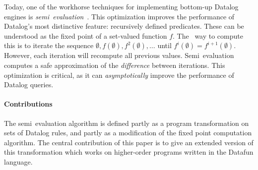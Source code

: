 Today, one of the workhorse techniques for implementing bottom-up Datalog
engines is \emph{semi\naive\ evaluation}~\cite{seminaive}. This optimization
improves the performance of Datalog's most distinctive feature: recursively
defined predicates. These can be understood as the fixed point of a set-valued
function $f$. The \naive\ way to compute this is to iterate the sequence
$\emptyset, f(\emptyset), f^2(\emptyset), \dots$ until $f^i(\emptyset) =
f^{i+1}(\emptyset)$. However, each iteration will recompute all previous values.
Semi\naive\ evaluation computes a safe approximation of the \emph{difference}
between iterations. This optimization is critical, as it can
\emph{asymptotically} improve the performance of Datalog queries.


\paragraph{Contributions} The semi\naive\ evaluation algorithm is
defined partly as a program transformation on sets of Datalog rules,
and partly as a modification of the fixed point computation algorithm.
The central contribution of this paper is to give an extended version
of this transformation which works on higher-order programs written
in the Datafun language. 

